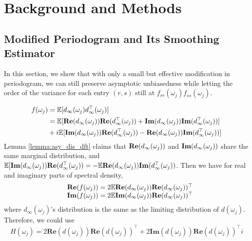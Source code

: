 \section{Background and Methods}
\label{sec:model-methods}
\subsection{Modified Periodogram and Its Smoothing Estimator}
In this section, we show that with only a small but effective modification in periodogram, we can still preserve asymptotic unbiasedness while letting the order of the variance for each entry $(r,s)$ still at $f_{rr}(\omega_j)f_{ss}(\omega_j)$. \par  
\begin{equation}
\begin{aligned}
f(\omega_j) & = \mathbb{E} [d_\infty (\omega_j) d^\top_\infty (\omega_j)]  \\
&  = \mathbb{E} [ {\bf Re}(d_\infty (\omega_j)){\bf Re}(d^\top_\infty (\omega_j)) + 
{\bf Im}(d_\infty (\omega_j)){\bf Im}(d^\top_\infty (\omega_j)) ] \\
& + i\mathbb{E} [ {\bf Im}(d_\infty (\omega_j)){\bf Re}(d^\top_\infty (\omega_j)) -
{\bf Re}(d_\infty (\omega_j)){\bf Im}(d^\top_\infty (\omega_j)) ]
\end{aligned}
\end{equation}
Lemma \ref{lemma:asy_dis_dft} claims that 
${\bf Re}(d_\infty (\omega_j))$ and ${\bf Im}(d_\infty (\omega_j))$ share the same marginal distribution,  and  
$\mathbb{E} [ {\bf Im}(d_\infty (\omega_j)){\bf Re}(d^\top_\infty (\omega_j)) = -\mathbb{E} 
{\bf Re}(d_\infty (\omega_j)){\bf Im}(d^\top_\infty (\omega_j)) $.  Then we have for real and imaginary parts of spectral density, 
\begin{equation}
\begin{array}{cc}
& \mathbf{Re}(f(\omega_j)) = 2 \mathbb{E} \mathbf{Re}(d_{\infty}(\omega_j))  \mathbf{Re}(d_{\infty}(\omega_j))^\top  \\
& \mathbf{Im}(f(\omega_j)) = 2\mathbb{E} \mathbf{Im}(d_{\infty}(\omega_j))  \mathbf{Re}(d_{\infty}(\omega_j))^\top 
\end{array}
\end{equation}
where $d_{\infty}(\omega_j)$'s distribution is the same as the limiting distribution of $d(\omega_j)$. Therefore, we could use
\begin{equation}
H(\omega_j) = 2\mathbf{Re}(d(\omega_j))  \mathbf{Re}(d(\omega_j))^\top+2\mathbf{Im}(d(\omega_j))  \mathbf{Re}(d(\omega_j))^\top i
\end{equation}
